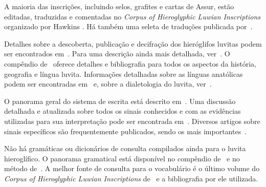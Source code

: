 \documentclass[article]{luvita}
\begin{document}
A maioria das inscrições, incluindo selos, grafites e cartas de Assur, estão
editadas, traduzidas e comentadas no \emph{Corpus of Hieroglyphic Luwian
	Inscriptions} organizado por Hawkins \cite{CHLI11,CHLI12,CHLI13,CHLI2,CHLI3}.
Há também uma seleta de traduções publicada por~\citet{Payne2012}.

Detalhes sobre a descoberta, publicação e decifração dos hieróglifos luvitas
podem ser encontrados em~\citet[pp. 131ff.]{HawkinsScripts}. Para uma descrição
ainda mais detalhada, ver~\citet[pp. 6-17]{CHLI11}.
O compêndio de~\citet{Melchert2003} oferece detalhes e bibliografia para todos
os aspectos da história, geografia e língua luvita.
Informações detalhadas sobre as línguas anatólicas podem ser encontradas
em~\citet[239--308]{HSK41.1} e, sobre a dialetologia do luvita,
ver~\citet{Yakubovich2010}.

O panorama geral do sistema de escrita está descrito
em~\citet[p. 155ff.]{HawkinsScripts}.
Uma discussão detalhada e atualizada sobre todos os sinais conhecidos e com
as evidências utilizadas para sua interpretação pode ser encontrada
em~\citet[354--488]{CHLI3}.
Diversos artigos sobre sinais específicos são frequentemente publicados, sendo
os mais
importantes~\citet{HawkinsMorpurgoNeumann1974,Rieken2008,RiekenYakubovich2010}.

Não há gramáticas ou dicionários de consulta compilados ainda para o luvita
hieroglífico.
O panorama gramatical está disponível no compêndio de~\citet{Melchert2003} e no
método de~\citet{Payne2010}.
A melhor fonte de consulta para o vocabulário é o último volume do \emph{Corpus
	of Hieroglyphic Luwian Inscriptions} de~\citet{CHLI13} e a bibliografia por ele
utilizada.


\printbibliography%
\end{document}
